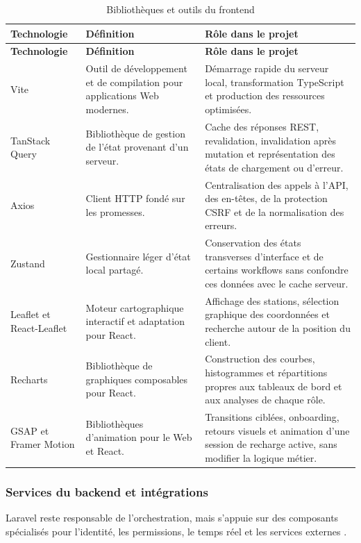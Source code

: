 \begin{longtable}{|p{3.0cm}|p{4.5cm}|p{6.5cm}|}
  \caption{Bibliothèques et outils du frontend}
  \label{tab:frontend-tools}\\
  \hline
  \rowcolor{ctmint}
  \textbf{Technologie} & \textbf{Définition} & \textbf{Rôle dans le projet}\\\hline
  \endfirsthead
  \hline
  \rowcolor{ctmint}
  \textbf{Technologie} & \textbf{Définition} & \textbf{Rôle dans le projet}\\\hline
  \endhead
  Vite &
  Outil de développement et de compilation pour applications Web modernes. &
  Démarrage rapide du serveur local, transformation TypeScript et production
  des ressources optimisées.\\\hline
  TanStack Query &
  Bibliothèque de gestion de l'état provenant d'un serveur. &
  Cache des réponses REST, revalidation, invalidation après mutation et
  représentation des états de chargement ou d'erreur.\\\hline
  Axios &
  Client HTTP fondé sur les promesses. &
  Centralisation des appels à l'API, des en-têtes, de la protection CSRF et de
  la normalisation des erreurs.\\\hline
  Zustand &
  Gestionnaire léger d'état local partagé. &
  Conservation des états transverses d'interface et de certains workflows sans
  confondre ces données avec le cache serveur.\\\hline
  Leaflet et React-Leaflet &
  Moteur cartographique interactif et adaptation pour React. &
  Affichage des stations, sélection graphique des coordonnées et recherche
  autour de la position du client.\\\hline
  Recharts &
  Bibliothèque de graphiques composables pour React. &
  Construction des courbes, histogrammes et répartitions propres aux tableaux
  de bord et aux analyses de chaque rôle.\\\hline
  GSAP et Framer Motion &
  Bibliothèques d'animation pour le Web et React. &
  Transitions ciblées, onboarding, retours visuels et animation d'une session
  de recharge active, sans modifier la logique métier.\\\hline
\end{longtable}

\subsubsection*{Services du backend et intégrations}

Laravel reste responsable de l'orchestration, mais s'appuie sur des composants
spécialisés pour l'identité, les permissions, le temps réel et les services
externes \cite{laravelSanctum,laravelSocialite,spatiePermission,laravelReverb,
resend,scramble,wiremock}.

